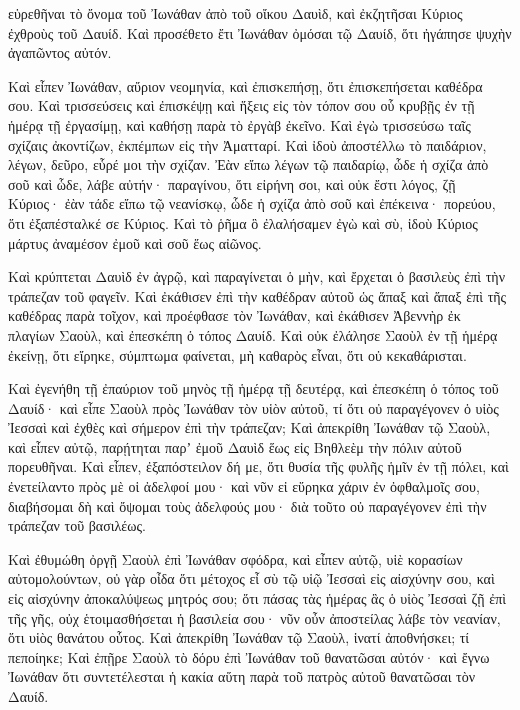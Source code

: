 {εὑρεθῆναι τὸ ὄνομα τοῦ Ἰωνάθαν ἀπὸ τοῦ οἴκου Δαυὶδ, καὶ ἐκζητῆσαι Κύριος ἐχθροὺς τοῦ Δαυίδ.
Καὶ προσέθετο ἔτι Ἰωνάθαν ὀμόσαι τῷ Δαυίδ, ὅτι ἠγάπησε ψυχὴν ἀγαπῶντος αὐτόν.
\par }{\PP {}Καὶ εἶπεν Ἰωνάθαν, αὔριον νεομηνία, καὶ ἐπισκεπήσῃ, ὅτι ἐπισκεπήσεται καθέδρα σου.
Καὶ τρισσεύσεις καὶ ἐπισκέψῃ καὶ ἥξεις εἰς τὸν τόπον σου οὗ κρυβῇς ἐν τῇ ἡμέρᾳ τῇ ἐργασίμῃ, καὶ καθήσῃ παρὰ τὸ ἐργὰβ ἐκεῖνο.
Καὶ ἐγὼ τρισσεύσω ταῖς σχίζαις ἀκοντίζων, ἐκπέμπων εἰς τὴν Ἀματταρί.
Καὶ ἰδοὺ ἀποστέλλω τὸ παιδάριον, λέγων, δεῦρο, εὗρέ μοι τὴν σχίζαν. Ἐὰν εἴπω λέγων τῷ παιδαρίῳ, ὧδε ἡ σχίζα ἀπὸ σοῦ καὶ ὧδε, λάβε αὐτήν· παραγίνου, ὅτι εἰρήνη σοι, καὶ οὐκ ἔστι λόγος, ζῇ Κύριος·
ἐὰν τάδε εἴπω τῷ νεανίσκῳ, ὧδε ἡ σχίζα ἀπὸ σοῦ καὶ ἐπέκεινα· πορεύου, ὅτι ἐξαπέσταλκέ σε Κύριος.
Καὶ τὸ ῥῆμα ὃ ἐλαλήσαμεν ἐγὼ καὶ σὺ, ἰδοὺ Κύριος μάρτυς ἀναμέσον ἐμοῦ καὶ σοῦ ἕως αἰῶνος.
\par }{\PP {}Καὶ κρύπτεται Δαυὶδ ἐν ἀγρῷ, καὶ παραγίνεται ὁ μὴν, καὶ ἔρχεται ὁ βασιλεὺς ἐπὶ τὴν τράπεζαν τοῦ φαγεῖν.
Καὶ ἐκάθισεν ἐπὶ τὴν καθέδραν αὐτοῦ ὡς ἅπαξ καὶ ἅπαξ ἐπὶ τῆς καθέδρας παρὰ τοῖχον, καὶ προέφθασε τὸν Ἰωνάθαν, καὶ ἐκάθισεν Ἀβεννὴρ ἐκ πλαγίων Σαοὺλ, καὶ ἐπεσκέπη ὁ τόπος Δαυίδ.
Καὶ οὐκ ἐλάλησε Σαοὺλ ἐν τῇ ἡμέρᾳ ἐκείνῃ, ὅτι εἴρηκε, σύμπτωμα φαίνεται, μὴ καθαρὸς εἶναι, ὅτι οὐ κεκαθάρισται.
\par }{\PP {}Καὶ ἐγενήθη τῇ ἐπαύριον τοῦ μηνὸς τῇ ἡμέρᾳ τῇ δευτέρᾳ, καὶ ἐπεσκέπη ὁ τόπος τοῦ Δαυίδ· καὶ εἶπε Σαοὺλ πρὸς Ἰωνάθαν τὸν υἱὸν αὐτοῦ, τί ὅτι οὐ παραγέγονεν ὁ υἱὸς Ἰεσσαὶ καὶ ἐχθὲς καὶ σήμερον ἐπὶ τὴν τράπεζαν;
Καὶ ἀπεκρίθη Ἰωνάθαν τῷ Σαοὺλ, καὶ εἶπεν αὐτῷ, παρῄτηται παρʼ ἐμοῦ Δαυὶδ ἕως εἰς Βηθλεὲμ τὴν πόλιν αὐτοῦ πορευθῆναι.
Καὶ εἶπεν, ἐξαπόστειλον δή με, ὅτι θυσία τῆς φυλῆς ἡμῖν ἐν τῇ πόλει, καὶ ἐνετείλαντο πρὸς μὲ οἱ ἀδελφοί μου· καὶ νῦν εἰ εὕρηκα χάριν ἐν ὀφθαλμοῖς σου, διαβήσομαι δὴ καὶ ὄψομαι τοὺς ἀδελφούς μου· διὰ τοῦτο οὐ παραγέγονεν ἐπὶ τὴν τράπεζαν τοῦ βασιλέως.
\par }{\PP {}Καὶ ἐθυμώθη ὀργῇ Σαοὺλ ἐπὶ Ἰωνάθαν σφόδρα, καὶ εἶπεν αὐτῷ, υἱὲ κορασίων αὐτομολούντων, οὐ γὰρ οἶδα ὅτι μέτοχος εἶ σὺ τῷ υἱῷ Ἰεσσαὶ εἰς αἰσχύνην σου, καὶ εἰς αἰσχύνην ἀποκαλύψεως μητρός σου;
ὅτι πάσας τὰς ἡμέρας ἃς ὁ υἱὸς Ἰεσσαὶ ζῇ ἐπὶ τῆς γῆς, οὐχ ἑτοιμασθήσεται ἡ βασιλεία σου· νῦν οὖν ἀποστείλας λάβε τὸν νεανίαν, ὅτι υἱὸς θανάτου οὗτος.
Καὶ ἀπεκρίθη Ἰωνάθαν τῷ Σαοὺλ, ἱνατί ἀποθνήσκει; τί πεποίηκε;
Καὶ ἐπῇρε Σαοὺλ τὸ δόρυ ἐπὶ Ἰωνάθαν τοῦ θανατῶσαι αὐτόν· καὶ ἔγνω Ἰωνάθαν ὅτι συντετέλεσται ἡ κακία αὕτη παρὰ τοῦ πατρὸς αὐτοῦ θανατῶσαι τὸν Δαυίδ.
}
